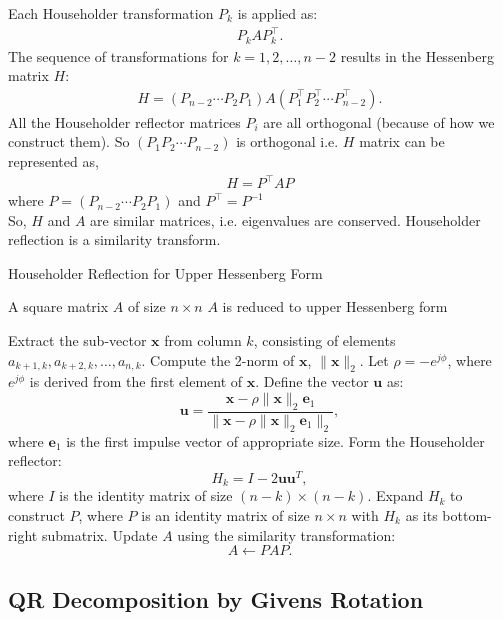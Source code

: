 \documentclass[12pt]{article}
\begin{document}
Each Householder transformation $P_k$ is applied as:
\begin{align*}
P_k A P_k^{\top}.
\end{align*}
The sequence of transformations for $k = 1, 2, \dots, n-2$ results in the Hessenberg matrix \(H\):
\begin{align*}
H = (P_{n-2} \cdots P_2 P_1)A(P_1^{\top} P_2^{\top} \cdots P_{n-2}^{\top}).
\end{align*}
All the Householder reflector matrices $P_i$ are all orthogonal (because of how we construct them). So $(P_1 P_2 \cdots P_{n-2})$ is orthogonal i.e. $H$ matrix can be represented as,
\begin{align*}
    H = P^{\top}A P
\end{align*}
where $P=(P_{n-2} \cdots P_2 P_1)$ and $P^{\top}=P^{-1}$\\
So, $H$ and $A$ are similar matrices, i.e. eigenvalues are conserved. Householder reflection is a similarity transform.
\begin{algorithm}[H]
\caption{Householder Reflection for Upper Hessenberg Form}
\begin{algorithmic}[1]
\REQUIRE A square matrix \( A \) of size \( n \times n \)
\ENSURE \( A \) is reduced to upper Hessenberg form

    \STATE Extract the sub-vector \( \mathbf{x} \) from column \( k \), consisting of elements \( a_{k+1,k}, a_{k+2,k}, \ldots, a_{n,k} \).
    \STATE Compute the 2-norm of \( \mathbf{x} \), \( \|\mathbf{x}\|_2 \).
    \STATE Let \( \rho = -e^{j\phi} \), where \( e^{j\phi} \) is derived from the first element of \( \mathbf{x} \).
    \STATE Define the vector \( \mathbf{u} \) as:
    \[
    \mathbf{u} = \frac{\mathbf{x} - \rho \|\mathbf{x}\|_2 \mathbf{e}_1}{\| \mathbf{x} - \rho \|\mathbf{x}\|_2 \mathbf{e}_1 \|_2},
    \]
    where \( \mathbf{e}_1 \) is the first impulse vector of appropriate size.
    \STATE Form the Householder reflector:
    \[
    H_k = I - 2\mathbf{u}\mathbf{u}^T,
    \]
    where \( I \) is the identity matrix of size \( (n-k) \times (n-k) \).
    \STATE Expand \( H_k \) to construct \( P \), where \( P \) is an identity matrix of size \( n \times n \) with \( H_k \) as its bottom-right submatrix.
    \STATE Update \( A \) using the similarity transformation:
    \[
    A \gets P A P.
    \]
\ENDFOR
\end{algorithmic}
\end{algorithm}


\subsection{QR Decomposition by Givens Rotation}
\end{document}
